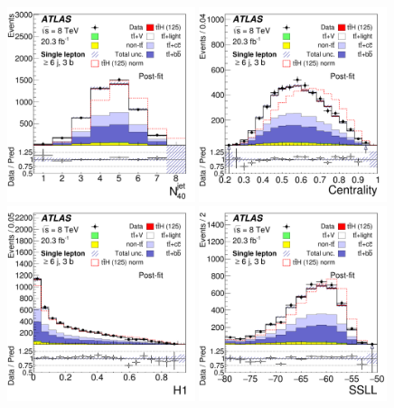 \begin{figure}[tp]
\begin{center}
\includegraphics[width=0.49\textwidth]{Appendices/Figures_separation/num_jet_40_6jincl5.pdf}
\includegraphics[width=0.49\textwidth]{Appendices/Figures_separation/cent_6jincl5.pdf} \\
\includegraphics[width=0.49\textwidth]{Appendices/Figures_separation/H1_6jincl5.pdf}
\includegraphics[width=0.49\textwidth]{Appendices/Figures_separation/ME_SLL_6jincl5.pdf}

\end{center}
\end{figure}
